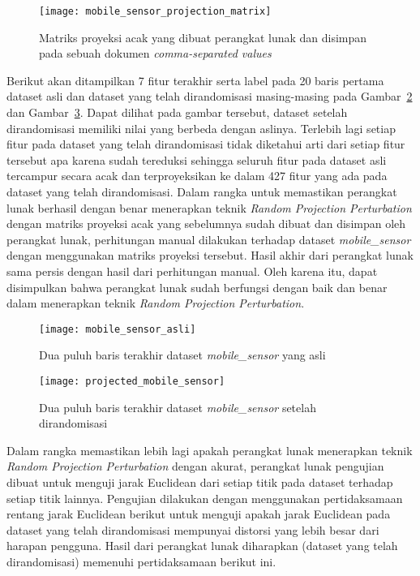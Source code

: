 \begin{figure}
	\centering
	\texttt{[image: mobile\_sensor\_projection\_matrix]}
	\caption{Matriks proyeksi acak yang dibuat perangkat lunak dan disimpan pada sebuah dokumen  \textit{comma-separated values}}
	\label{fig:mobile_sensor_projection_matrix}
\end{figure}

Berikut akan ditampilkan 7 fitur terakhir serta label pada 20 baris pertama dataset asli dan dataset yang telah dirandomisasi masing-masing pada Gambar~\ref{fig:mobile_sensor_asli} dan Gambar~\ref{fig:projected_mobile_sensor}. Dapat dilihat pada gambar tersebut, dataset setelah dirandomisasi memiliki nilai yang berbeda dengan aslinya. Terlebih lagi setiap fitur pada dataset yang telah dirandomisasi tidak diketahui arti dari setiap fitur tersebut apa karena sudah tereduksi sehingga seluruh fitur pada dataset asli tercampur secara acak dan terproyeksikan ke dalam 427 fitur yang ada pada dataset yang telah dirandomisasi. Dalam rangka untuk memastikan perangkat lunak berhasil dengan benar menerapkan teknik \textit{Random Projection Perturbation} dengan matriks proyeksi acak yang sebelumnya sudah dibuat dan disimpan oleh perangkat lunak, perhitungan manual dilakukan terhadap dataset \textit{mobile\_sensor} dengan menggunakan matriks proyeksi tersebut. Hasil akhir dari perangkat lunak sama persis dengan hasil dari perhitungan manual. Oleh karena itu, dapat disimpulkan bahwa perangkat lunak sudah berfungsi dengan baik dan benar dalam menerapkan teknik \textit{Random Projection Perturbation}.

\begin{figure}
	\centering
	\texttt{[image: mobile\_sensor\_asli]}
	\caption{Dua puluh baris terakhir dataset \textit{mobile\_sensor} yang asli}
	\label{fig:mobile_sensor_asli}
\end{figure}

\begin{figure}
	\centering
	\texttt{[image: projected\_mobile\_sensor]}
	\caption{Dua puluh baris terakhir dataset \textit{mobile\_sensor} setelah dirandomisasi}
	\label{fig:projected_mobile_sensor}
\end{figure}

Dalam rangka memastikan lebih lagi apakah perangkat lunak menerapkan teknik \textit{Random Projection Perturbation} dengan akurat, perangkat lunak pengujian dibuat untuk menguji jarak Euclidean dari setiap titik pada dataset terhadap setiap titik lainnya. Pengujian dilakukan dengan menggunakan pertidaksamaan rentang jarak Euclidean berikut untuk menguji apakah jarak Euclidean pada dataset yang telah dirandomisasi mempunyai distorsi yang lebih besar dari harapan pengguna. Hasil dari perangkat lunak diharapkan (dataset yang telah dirandomisasi) memenuhi pertidaksamaan berikut ini.

